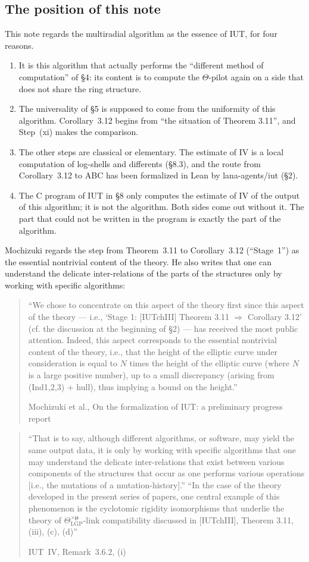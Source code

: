 \documentclass[11pt,a4paper]{article}
\newcommand{\lab}[2]{{\upshape\fcolorbox{#1}{#1!8}{\scriptsize\sffamily\bfseries\textcolor{#1}{#2}}}}
\newcommand{\tagS}{\lab{blue}{S}}
\newcommand{\tagH}{\lab{BurntOrange}{H}}
\newcommand{\q}[1]{``#1''}
\newcommand{\srcquote}[2]{\begin{quote}\small #1\par\nopagebreak\hfill{\footnotesize #2}\end{quote}}
\begin{document}
\subsection{The position of this note}
\tagH{} This note regards the multiradial algorithm as the essence of IUT, for four reasons.
\begin{enumerate}
\item It is this algorithm that actually performs the ``different method of computation'' of \S4: its content is to
compute the $\Theta$-pilot again on a side that does not share the ring structure.
\item The universality of \S5 is supposed to come from the uniformity of this algorithm. Corollary~3.12 begins from
``the situation of Theorem 3.11'', and Step~(xi) makes the comparison.
\item The other steps are classical or elementary. The estimate of IV is a local computation of log-shells and
differents (\S8.3), and the route from Corollary~3.12 to ABC has been formalized in Lean by lana-agents/iut (\S2).
\item The C program of IUT in \S8 only computes the estimate of IV of the output of this algorithm; it is not the
algorithm. Both sides come out without it. The part that could not be written in the program is exactly the part of
the algorithm.
\end{enumerate}

\tagS{} Mochizuki regards the step from Theorem~3.11 to Corollary~3.12 (``Stage~1'') as the essential nontrivial content
of the theory. He also writes that one can understand the delicate inter-relations of the parts of the structures only
by working with specific algorithms:
\srcquote{\q{We chose to concentrate on this aspect of the theory first since this aspect of the theory --- i.e.,
`Stage 1: [IUTchIII] Theorem 3.11 $\Longrightarrow$ Corollary 3.12' (cf. the discussion at the beginning of \S2) ---
has received the most public attention. Indeed, this aspect corresponds to the essential nontrivial content of the
theory, i.e., that the height of the elliptic curve under consideration is equal to $N$ times the height of the elliptic
curve (where $N$ is a large positive number), up to a small discrepancy (arising from (Ind1,2,3) + hull), thus implying a
bound on the height.}}{Mochizuki et al., On the formalization of IUT: a preliminary progress report \cite{Form}}
\srcquote{\q{That is to say, although different algorithms, or software, may yield the same output data, it is only by
working with specific algorithms that one may understand the delicate inter-relations that exist between various
components of the structures that occur as one performs various operations [i.e., the mutations of a
mutation-history].} \q{In the case of the theory developed in the present series of papers, one central example of
this phenomenon is the cyclotomic rigidity isomorphisms that underlie the theory of
$\Theta^{\times\boldsymbol\mu}_{\mathrm{LGP}}$-link compatibility discussed in [IUTchIII], Theorem 3.11, (iii),
(c), (d)}}{IUT~IV, Remark~3.6.2, (i) \cite{IUT4}}
\end{document}
